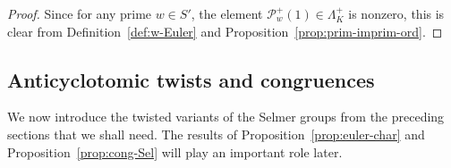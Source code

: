 \documentclass[a4paper,10pt]{amsart}
\numberwithin{equation}{section}
\numberwithin{equation}{section}
\theoremstyle{plain}
\theoremstyle{definition}
\theoremstyle{definition}
\theoremstyle{plain}
\theoremstyle{plain}
\theoremstyle{plain}
\theoremstyle{plain}
\newcommand{\Q}{\mathbb{Q}}
\newcommand{\X}{\mathfrak{X}}
\DeclareMathOperator{\ch}{ch}
\begin{document}
\begin{proof}
Since for any prime $w\in S'$, the element $\mathcal{P}_w^+(1)\in\Lambda_K^+$ is nonzero, this is clear from Definition~\ref{def:w-Euler} and Proposition~\ref{prop:prim-imprim-ord}.
\end{proof}




\subsection{Anticyclotomic twists and congruences}\label{sec:seltwist}

We now introduce the twisted variants of the Selmer groups from the preceding sections that we shall need. The results of Proposition~\ref{prop:euler-char} and Proposition~\ref{prop:cong-Sel} will play an important role later.


\end{document}
